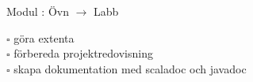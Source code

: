 
    Modul : Övn  $\rightarrow$ Labb 
    \begin{multicols}{3}\SlideFontTiny
    $\square$ göra extenta \\
$\square$ förbereda projektredovisning \\
$\square$ skapa dokumentation med scaladoc och javadoc \\
    \end{multicols}
    